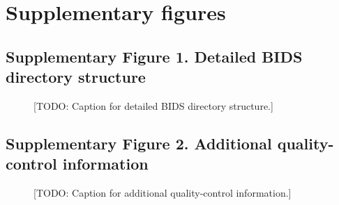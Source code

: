 
\section*{Supplementary figures}

\subsection*{Supplementary Figure 1. Detailed BIDS directory structure}

\begin{figure}[htbp]
    \centering
    \caption{[TODO: Caption for detailed BIDS directory structure.]}
    \label{fig:supp-bids-tree}
\end{figure}

\subsection*{Supplementary Figure 2. Additional quality-control information}

\begin{figure}[htbp]
    \centering
    \caption{[TODO: Caption for additional quality-control information.]}
    \label{fig:supp-qc}
\end{figure}
